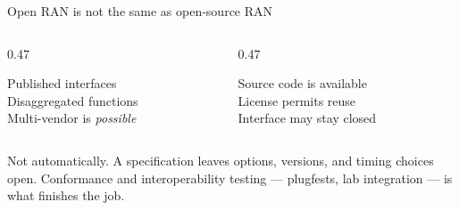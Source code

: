 \begin{frame}{Open RAN is not the same as open-source RAN}
  \begin{columns}[T,onlytextwidth]
    \begin{column}{0.47\textwidth}
      \begin{tcolorbox}[colback=blue!4,colframe=ranblue,title=Open RAN]
        Published interfaces\\[0.35em]
        Disaggregated functions\\[0.35em]
        Multi-vendor is \emph{possible}
      \end{tcolorbox}
    \end{column}
    \begin{column}{0.47\textwidth}
      \begin{tcolorbox}[colback=purple!5,colframe=ranpurple,title=Open source]
        Source code is available\\[0.35em]
        License permits reuse\\[0.35em]
        Interface may stay closed
      \end{tcolorbox}
    \end{column}
  \end{columns}

     {Not automatically. A specification leaves options, versions, and timing
      choices open. Conformance and interoperability testing --- plugfests, lab
      integration --- is what finishes the job.}
\end{frame}

